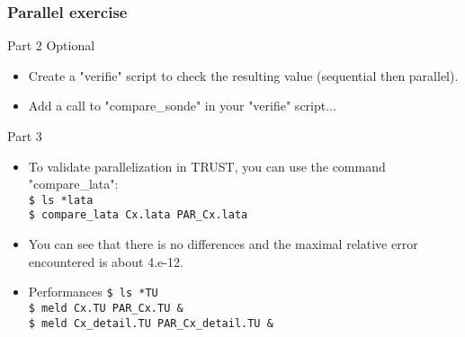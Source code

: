 \documentclass[10pt, hyperref={unicode=true,pdfusetitle, bookmarks=true,bookmarksnumbered=false,bookmarksopen=false, breaklinks=false,pdfborder={0 0 1},backref=true,colorlinks=true,linkcolor=darkblue,pageanchor, urlcolor=darkblue}]{beamer}
\begin{document}
\begin{frame}
\frametitle{Parallel exercise}

\begin{block}{Part 2 Optional}
\begin{itemize}
\item Create a "verifie" script to check the resulting value (sequential then parallel).
\item Add a call to "compare\_sonde" in your "verifie" script...
\end{itemize}
\end{block}

\begin{block}{Part 3}
\begin{itemize}
\item To validate parallelization in TRUST, you can use the command "compare\_lata":\\
\texttt{\$ ls *lata }\\
\texttt{\$ compare\_lata  Cx.lata  PAR\_Cx.lata }
\item You can see that there is no differences and the maximal relative error encountered is about 4.e-12.
\item Performances
\texttt{\$ ls *TU }\\
\texttt{\$ meld Cx.TU PAR\_Cx.TU \& }\\
\texttt{\$ meld Cx\_detail.TU PAR\_Cx\_detail.TU \& }\\
\end{itemize}
\end{block}

\end{frame}
\end{document}

